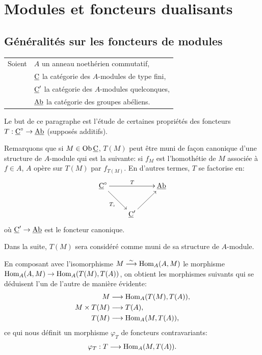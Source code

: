 \chapter{Modules et foncteurs dualisants} \label{IV}

\section{G\'en\'eralit\'es sur les foncteurs de modules} \label{IV.1}
\ignorespaces
\hspace*{-3mm}
\begin{tabular}{ll}
Soient &$A$ un anneau noeth\'erien commutatif,\\
&$\underline{\mathrm{C}}$ la cat\'egorie des $A$-modules de type fini,\\
&$\underline{\mathrm{C}}'$ la cat\'egorie des $A$-modules quelconques,\\
&$\underline{\mathrm{Ab}}$ la cat\'egorie des groupes ab\'eliens.{toto}\label{pIV.1}
\end{tabular}

\smallskip
Le but de ce paragraphe est l'\'etude de certaines propri\'et\'es des foncteurs \hbox{$T: \ccat^{\circ}\to \Ab$} (suppos\'es additifs).

Remarquons que si $M\in \operatorname{Ob} \underline{\mathrm{C}}$, $T(M)$ peut \^etre muni de fa\c
con canonique d'une structure de $A$-module qui est la suivante:
si $f_{M}$ est l'homoth\'etie de $M$ associ\'ee \`a $f\in A$, $A$
op\`ere sur $T(M)$ par $f_{T(M)}$. En d'autres termes, $T$ se
factorise en:
$$
\xymatrix{ {\ccat^{\circ}}\ar^{T}[rr]\ar_{T_{\circ}}[dr]&&\Ab\\
&{\ccat^{\prime}}\ar[ur]&}
$$
o\`u $\ccat'\to \Ab$ est le foncteur canonique.

Dans la suite, $T(M)$ sera consid\'er\'e comme muni de sa structure de $A$-module.

En composant avec l'isomorphisme \hbox{$M\overset{\sim}{\longrightarrow} \operatorname{Hom}_{A}(A, M)$} le morphisme $\Hom_{A}(A, M)\to \Hom_{A}(T(M), T(A))$, on obtient les morphismes suivants qui se d\'eduisent l'un de l'autre de mani\`ere \'evidente:
\begin{align*}
M&\to \Hom_{A}(T(M), T(A)),\\
M\times T(M)&\to T(A),\\
T(M)&\to \Hom_{A}(M, T(A)),
\end{align*}
ce qui nous d\'efinit un morphisme $\varphi_{T}$ de foncteurs contravariants:
\begin{eqnarray*}
\varphi_{T}: T\to \Hom_{A}(M, T(A)).
\end{eqnarray*}

